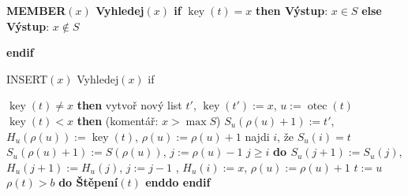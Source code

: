 \documentclass[a4paper,12pt]{article}
\DeclareMathOperator*{\otec}{otec}
\DeclareMathOperator*{\key}{key}
\begin{document}
{\bf MEMBER$(x)$\newline 
Vyhledej$(x)$\newline 
if} $\key(t)=x$ {\bf then Výstup}: $x\in S$ {\bf else Výstup}: $x\notin S$ {\bf endif

INSERT$(x)$\newline
Vyhledej$(x)$\newline 
if} $\key(t)\ne x$ {\bf then}\newline 
\phantom{---}vytvoř nový list $t'$, $\key(t'):=x$, $u:=\otec(t)$\newline 
\phantom{---}{\bf if} $\key(t)<x$ {\bf then}\newline 
(komentář: $x>\max S$)\newline 
\phantom{------}$S_u(\rho (u)+1):=t'$, $H_u(\rho (u)):=\key(t)$, $\rho (u):=\rho 
(u)+1$\newline 
\phantom{---}{\bf else}\newline 
\phantom{------}najdi $i$, že $S_u(i)=t$\newline 
\phantom{------}$S_u(\rho (u)+1):=S(\rho (u))$, $j:=\rho (u)-1$\newline 
\phantom{------}{\bf while} $j\ge i$ {\bf do\newline 
\phantom{---------}$S_u(j+1):=S_u(j)$}, $H_u(j+1):=H_u(j)$, $j:=j-1$\newline 
{}, $H_u(i):=x$, $\rho (u):=\rho (u)+1$\newline 
\phantom{---}{\bf endif}\newline 
\phantom{---}$t:=u$\newline 
\phantom{---}{\bf while} $\rho (t)>b$ {\bf do Štěpení$(t)$ enddo\newline 
endif}
\end{document}

